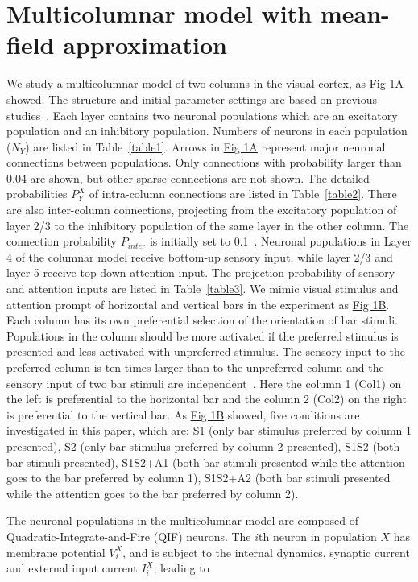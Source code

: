 \documentclass[10pt,letterpaper]{article}
\begin{document}
\section*{Multicolumnar model with mean-field approximation}
We study a multicolumnar model of two columns in the visual cortex, as \hyperlink{fig:fig1}{Fig 1A} showed. The structure and initial parameter settings are based on previous studies~\cite{wagatsuma2011}. Each layer contains two neuronal populations which are an excitatory population and an inhibitory population. Numbers of neurons in each population ($N_{Y}$) are listed in Table~\ref{table1}. Arrows in \hyperlink{fig:fig1}{Fig 1A} represent major neuronal connections between populations. Only connections with probability larger than 0.04 are shown, but other sparse connections are not shown. The detailed probabilities $P_{Y}^{X}$ of intra-column connections are listed in Table~\ref{table2}. There are also inter-column connections, projecting from the excitatory population of layer 2/3 to the inhibitory population of the same layer in the other column. The connection probability $P_{inter}$ is initially set to 0.1~\cite{wagatsuma2011}. Neuronal populations in Layer 4 of the columnar model receive bottom-up sensory input, while layer 2/3 and layer 5 receive top-down attention input. The projection probability of sensory and attention inputs are listed in Table~\ref{table3}. We mimic visual stimulus and attention prompt of horizontal and vertical bars in the experiment as \hyperlink{fig:fig1}{Fig 1B}. Each column has its own preferential selection of the orientation of bar stimuli. Populations in the column should be more activated if the preferred stimulus is presented and less activated with unpreferred stimulus. The sensory input to the preferred column is ten times larger than to the unpreferred column and the sensory input of two bar stimuli are independent~\cite{wagatsuma2011}. Here the column 1 (Col1) on the left is preferential to the horizontal bar and the column 2 (Col2) on the right is preferential to the vertical bar. As \hyperlink{fig:fig1}{Fig 1B} showed, five conditions are investigated in this paper, which are: S1 (only bar stimulus preferred by column 1 presented), S2 (only bar stimulus preferred by column 2 presented), S1S2 (both bar stimuli presented), S1S2+A1 (both bar stimuli presented while the attention goes to the bar preferred by column 1), S1S2+A2 (both bar stimuli presented while the attention goes to the bar preferred by column 2).

The neuronal populations in the multicolumnar model are composed of Quadratic-Integrate-and-Fire (QIF) neurons. The $i$th neuron in population $X$ has membrane potential $V_{i}^{X}$, and is subject to the internal dynamics, synaptic current and external input current $I_{i}^{X}$, leading to 
\end{document}
